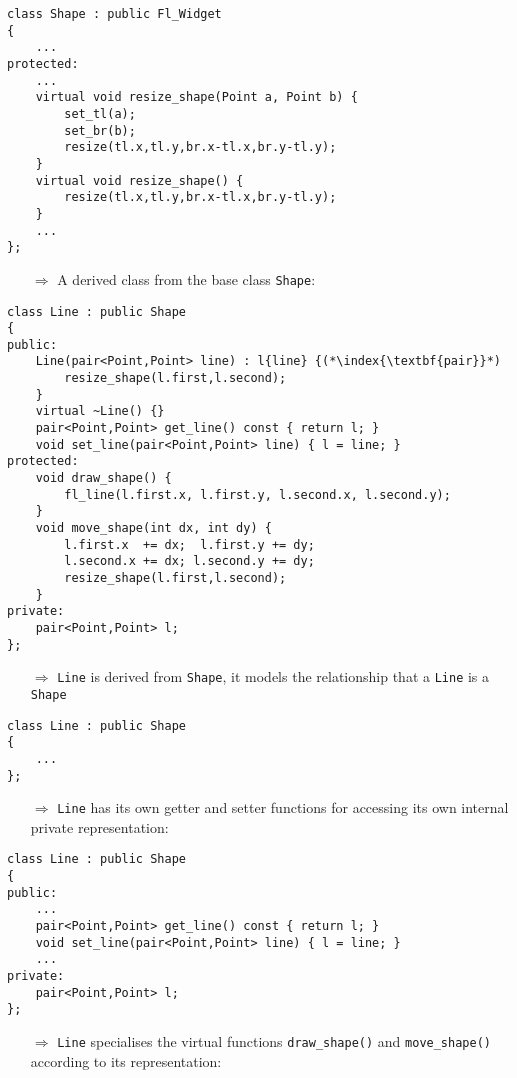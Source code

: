 \documentclass[10pt]{article}
\begin{document}
\begin{lstlisting}
class Shape : public Fl_Widget
{
    ...
protected:
    ...
    virtual void resize_shape(Point a, Point b) {
        set_tl(a);
        set_br(b);
        resize(tl.x,tl.y,br.x-tl.x,br.y-tl.y);
    }
    virtual void resize_shape() {
        resize(tl.x,tl.y,br.x-tl.x,br.y-tl.y);
    }
    ...
};
\end{lstlisting}
\begin{enumerate}
\item[$\Rightarrow$] A derived class from the base class \texttt{Shape}:
\end{enumerate}
\begin{lstlisting}
class Line : public Shape
{
public:
    Line(pair<Point,Point> line) : l{line} {(*\index{\textbf{pair}}*)
        resize_shape(l.first,l.second);
    }
    virtual ~Line() {}
    pair<Point,Point> get_line() const { return l; }
    void set_line(pair<Point,Point> line) { l = line; }
protected:
    void draw_shape() {
        fl_line(l.first.x, l.first.y, l.second.x, l.second.y);
    }
    void move_shape(int dx, int dy) {
        l.first.x  += dx;  l.first.y += dy;
        l.second.x += dx; l.second.y += dy;
        resize_shape(l.first,l.second);
    }
private:
    pair<Point,Point> l;
};
\end{lstlisting}
\begin{enumerate}
\item[$\Rightarrow$] \texttt{Line} is derived from \texttt{Shape}, it models the relationship that a \texttt{Line} is a \texttt{Shape}
\end{enumerate}
\begin{lstlisting}
class Line : public Shape
{
    ...
};
\end{lstlisting}
\begin{enumerate}
\item[$\Rightarrow$] \texttt{Line} has its own getter and setter functions for accessing its own internal private representation:
\end{enumerate}
\begin{lstlisting}
class Line : public Shape
{
public:
    ...
    pair<Point,Point> get_line() const { return l; }
    void set_line(pair<Point,Point> line) { l = line; }
    ...
private:
    pair<Point,Point> l;
};
\end{lstlisting}
\begin{enumerate}
\item[$\Rightarrow$] \texttt{Line} specialises the virtual functions \texttt{draw\_shape()} and \texttt{move\_shape()} according to its representation:
\end{enumerate}
\end{document}
